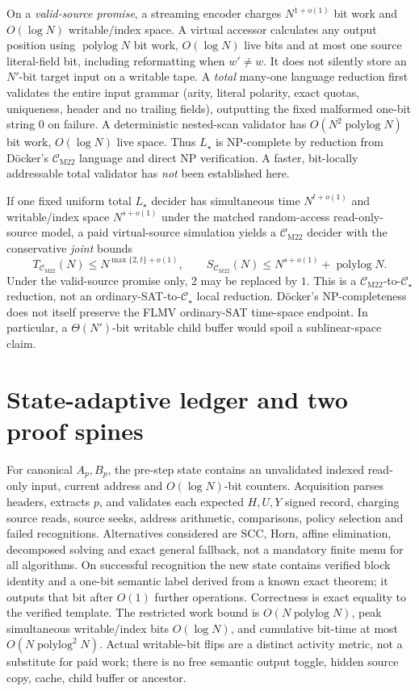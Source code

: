 \documentclass[11pt]{article}
\newcommand{\CM}{\mathcal C_{\mathrm{M22}}}
\newcommand{\CS}{\mathcal C_{\star}}
\begin{document}
On a \emph{valid-source promise}, a streaming encoder charges \(N^{1+o(1)}\) bit work and \(O(\log N)\) writable/index space. A virtual accessor calculates any output position using \(\operatorname{polylog}N\) bit work, \(O(\log N)\) live bits and at most one source literal-field bit, including reformatting when \(w'\ne w\). It does not silently store an \(N'\)-bit target input on a writable tape. A \emph{total} many-one language reduction first validates the entire input grammar (arity, literal polarity, exact quotas, uniqueness, header and no trailing fields), outputting the fixed malformed one-bit string \(0\) on failure. A deterministic nested-scan validator has \(O(N^2\operatorname{polylog}N)\) bit work, \(O(\log N)\) live space. Thus \(L_\star\) is NP-complete by reduction from D\"ocker's \(\CM\) language and direct NP verification. A faster, bit-locally addressable total validator has \emph{not} been established here.

If one fixed uniform total \(L_\star\) decider has simultaneous time \(N^{t+o(1)}\) and writable/index space \(N^{s+o(1)}\) under the matched random-access read-only-source model, a paid virtual-source simulation yields a \(\CM\) decider with the conservative \emph{joint} bounds
\[
T_{\CM}(N)\le N^{\max\{2,t\}+o(1)},\qquad
S_{\CM}(N)\le N^{s+o(1)}+\operatorname{polylog}N.
\]
Under the valid-source promise only, \(2\) may be replaced by \(1\). This is a \(\CM\)-to-\(\CS\) reduction, not an ordinary-SAT-to-\(\CS\) local reduction. D\"ocker's NP-completeness does not itself preserve the FLMV ordinary-SAT time-space endpoint. In particular, a \(\Theta(N')\)-bit writable child buffer would spoil a sublinear-space claim.

\section{State-adaptive ledger and two proof spines}
For canonical \(A_p,B_p\), the pre-step state contains an unvalidated indexed read-only input, current address and \(O(\log N)\)-bit counters. Acquisition parses headers, extracts \(p\), and validates each expected \(H,U,Y\) signed record, charging source reads, source seeks, address arithmetic, comparisons, policy selection and failed recognitions. Alternatives considered are SCC, Horn, affine elimination, decomposed solving and exact general fallback, not a mandatory finite menu for all algorithms. On successful recognition the new state contains verified block identity and a one-bit semantic label derived from a known exact theorem; it outputs that bit after \(O(1)\) further operations. Correctness is exact equality to the verified template. The restricted work bound is \(O(N\operatorname{polylog}N)\), peak simultaneous writable/index bits \(O(\log N)\), and cumulative bit-time at most \(O(N\operatorname{polylog}^2N)\). Actual writable-bit flips are a distinct activity metric, not a substitute for paid work; there is no free semantic output toggle, hidden source copy, cache, child buffer or ancestor.
\end{document}
